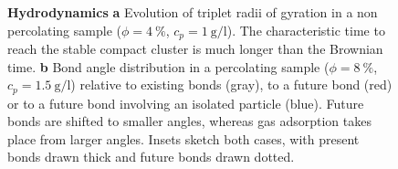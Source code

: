 \begin{figure}
	\caption{\textbf{Hydrodynamics} \textbf{a} Evolution of triplet radii of gyration in a non percolating sample ($\phi=4~\%$, $c_p=\SI{1}{\gram\per\litre}$). The characteristic time to reach the stable compact cluster is much longer than the Brownian time. \textbf{b} Bond angle distribution in a percolating sample ($\phi=8~\%$, $c_p=\SI{1.5}{\gram\per\litre}$) relative to existing bonds (gray), to a future bond (red) or to a future bond involving an isolated particle (blue). Future bonds are shifted to smaller angles, whereas gas adsorption takes place from larger angles. Insets sketch both cases, with present bonds drawn thick and future bonds drawn dotted.}
	\label{fig:hydro}
\end{figure}

